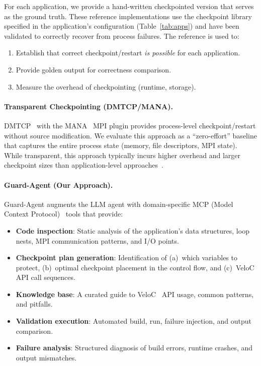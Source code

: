 For each application, we provide a hand-written checkpointed version that serves as the ground truth. These reference implementations use the checkpoint library specified in the application's configuration (Table~\ref{tab:apps}) and have been validated to correctly recover from process failures. The reference is used to:

\begin{enumerate}
    \item Establish that correct checkpoint/restart \emph{is possible} for each application.
    \item Provide golden output for correctness comparison.
    \item Measure the overhead of checkpointing (runtime, storage).
\end{enumerate}

\paragraph{Transparent Checkpointing (DMTCP/MANA).}

DMTCP~\cite{dmtcp} with the MANA~\cite{mana} MPI plugin provides process-level checkpoint/restart without source modification. We evaluate this approach as a ``zero-effort'' baseline that captures the entire process state (memory, file descriptors, MPI state). While transparent, this approach typically incurs higher overhead and larger checkpoint sizes than application-level approaches~\cite{cr-survey}.

\paragraph{Guard-Agent (Our Approach).}

Guard-Agent augments the LLM agent with domain-specific MCP (Model Context Protocol)~\cite{mcp} tools that provide:

\begin{itemize}
    \item \textbf{Code inspection}: Static analysis of the application's data structures, loop nests, MPI communication patterns, and I/O points.
    \item \textbf{Checkpoint plan generation}: Identification of (a)~which variables to protect, (b)~optimal checkpoint placement in the control flow, and (c)~VeloC API call sequences.
    \item \textbf{Knowledge base}: A curated guide to VeloC~\cite{veloc} API usage, common patterns, and pitfalls.
    \item \textbf{Validation execution}: Automated build, run, failure injection, and output comparison.
    \item \textbf{Failure analysis}: Structured diagnosis of build errors, runtime crashes, and output mismatches.
\end{itemize}

